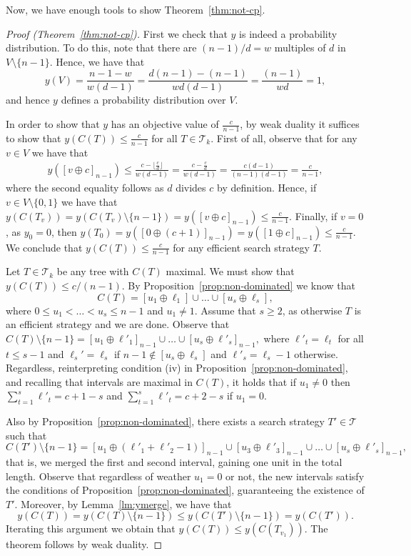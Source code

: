 \documentclass[11pt]{article}
\newcommand\+{\mkern2mu}
\newcommand{\T}{T}
\begin{document}
Now, we have enough tools to show Theorem~\ref{thm:not-cp}. 

\begin{proof}[Proof (Theorem~\ref{thm:not-cp})]

    First we check that $y$ is indeed a probability distribution. To do this, note that there are $(n-1)/d = w$ multiples of $d$ in $V\setminus\{n-1\}$. Hence, we have that
$$y(V)= \frac{n-1-w}{w(d-1)}=\frac{d(n-1)-(n-1)}{wd(d-1)} = \frac{(n-1)}{wd}=1,$$
and hence $y$ defines a probability distribution over $V$.

In order to show that $y$ has an objective value of $\frac{c}{n-1}$, by weak duality it suffices to show that $y(C(T))\le \frac{c}{n-1}$ for all $\T\in \mathcal{T}_k.$ First of all, observe that for any $v\in V$ we have that 
\begin{align*}
    y([v\oplus c]_{n-1})\le \frac{c - \lfloor \frac{c}{d}\rfloor}{w(d-1)}
    = \frac{c- \frac{c}{d}}{w(d-1)}
    = \frac{c(d-1)}{(n-1)(d-1)}= \frac{c}{n-1},
\end{align*}
where the second equality follows as $d$ divides $c$ by definition. Hence, if $v\in V\setminus\{0,1\}$ we have that $y(C(\T_v))= y(C(\T_v)\setminus\{n-1\})= y([v\oplus c]_{n-1})\le \frac{c}{n-1}$. Finally, if $v=0$, as $y_0=0$, then $y(T_0)=y([0\oplus (c+1)]_{n-1})= y([1\oplus c]_{n-1}) \le \frac{c}{n-1}$. We conclude that $y(C(T))\le \frac{c}{n-1}$ for any efficient search strategy $\T$. 

Let $\T \in \mathcal{T}_k$ be any tree with $C(\T)$ maximal. We must show that $y(C(T))\le c/(n-1)$. By Proposition~\ref{prop:non-dominated} we know that $$ C(T) = [u_1 \oplus \ell_1] \cup \ldots \cup [u_s \oplus \ell_s],$$
where $0\le u_1< \ldots < u_s\le n-1$ and $u_1\neq 1$. Assume that $s\ge 2$, as otherwise $\T$ is an efficient strategy and we are done. Observe that $C(T)\setminus\{n-1\} = [u_1 \oplus \ell'_1]_{n-1} \cup \ldots \cup [u_s \oplus \ell'_s]_{n-1},$ where $\ell'_t = \ell_t$ for all $t\le s-1$ and $\ell_s'=\ell_s$ if $n-1\not\in [u_s \oplus \ell_s]$ and $\ell'_s=\ell_s-1$ otherwise. Regardless, reinterpreting condition (iv) in Proposition~\ref{prop:non-dominated}, and recalling that intervals are maximal in $C(\T)$, it holds that if $u_1\neq 0$ then $\sum_{t=1}^s \ell'_t=c+1-s$ and $\sum_{t=1}^s \ell'_t=c+2-s$ if $u_1=0$. 

Also by Proposition~\ref{prop:non-dominated}, there exists a search strategy $\T'\in \mathcal{T}$ such that 
\[C(\T')\setminus\{n-1\}=[u_1 \oplus (\ell'_1+\ell'_2-1)]_{n-1} \cup  [u_{3} \oplus \ell'_{3}]_{n-1}\cup \ldots \cup [u_s \oplus \ell'_s]_{n-1}, \]
that is, we merged the first and second interval, gaining one unit in the total length. Observe that regardless of weather $u_1=0$ or not, the new intervals satisfy the conditions of Proposition~\ref{prop:non-dominated}, guaranteeing the existence of $\T'$. Moreover, by Lemma~\ref{lm:ymerge}, we have that 
$$y(C(\T))=y(C(\T)\setminus\{n-1\})\le y(C(\T')\setminus\{n-1\})=y(C(\T')).$$
Iterating this argument we obtain that $y(C(\T))\le y(C(T_{v_1})).$ The theorem follows by weak duality.
\end{proof}
\end{document}
